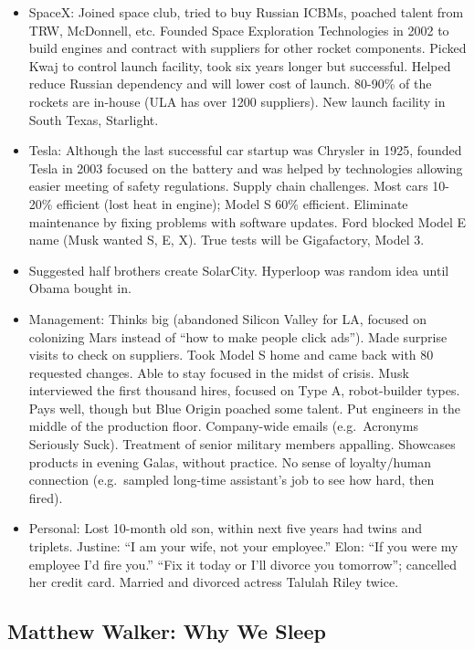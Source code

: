 \documentclass[
]{article}
\begin{document}
\begin{itemize}
\item
  SpaceX: Joined space club, tried to buy Russian ICBMs, poached talent
  from TRW, McDonnell, etc. Founded Space Exploration Technologies in
  2002 to build engines and contract with suppliers for other rocket
  components. Picked Kwaj to control launch facility, took six years
  longer but successful. Helped reduce Russian dependency and will lower
  cost of launch. 80-90\% of the rockets are in-house (ULA has over 1200
  suppliers). New launch facility in South Texas, Starlight.
\item
  Tesla: Although the last successful car startup was Chrysler in 1925,
  founded Tesla in 2003 focused on the battery and was helped by
  technologies allowing easier meeting of safety regulations. Supply
  chain challenges. Most cars 10-20\% efficient (lost heat in engine);
  Model S 60\% efficient. Eliminate maintenance by fixing problems with
  software updates. Ford blocked Model E name (Musk wanted S, E, X).
  True tests will be Gigafactory, Model 3.
\item
  Suggested half brothers create SolarCity. Hyperloop was random idea
  until Obama bought in.
\item
  Management: Thinks big (abandoned Silicon Valley for LA, focused on
  colonizing Mars instead of ``how to make people click ads''). Made
  surprise visits to check on suppliers. Took Model S home and came back
  with 80 requested changes. Able to stay focused in the midst of
  crisis. Musk interviewed the first thousand hires, focused on Type A,
  robot-builder types. Pays well, though but Blue Origin poached some
  talent. Put engineers in the middle of the production floor.
  Company-wide emails (e.g.~Acronyms Seriously Suck). Treatment of
  senior military members appalling. Showcases products in evening
  Galas, without practice. No sense of loyalty/human connection
  (e.g.~sampled long-time assistant's job to see how hard, then fired).
\item
  Personal: Lost 10-month old son, within next five years had twins and
  triplets. Justine: ``I am your wife, not your employee.'' Elon: ``If
  you were my employee I'd fire you.'' ``Fix it today or I'll divorce
  you tomorrow''; cancelled her credit card. Married and divorced
  actress Talulah Riley twice.
\end{itemize}

\hypertarget{matthew-walker-why-we-sleep}{%
\subsection{Matthew Walker: Why We
Sleep}\label{matthew-walker-why-we-sleep}}
\end{document}

